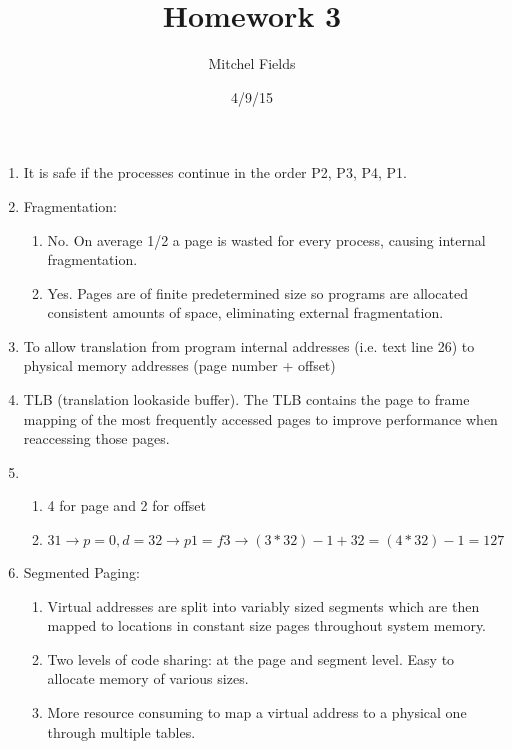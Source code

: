 \documentclass{article}
\begin{document}
\title{Homework 3}
\author{Mitchel Fields}
\date{4/9/15}
\maketitle

\begin{enumerate}

\item It is safe if the processes continue in the order P2, P3, P4, P1.

\item Fragmentation:
\begin{enumerate}
\renewcommand{\theenumi}{\Alph{enumi}}
\item No. On average 1/2 a page is wasted for every process, causing internal fragmentation.

\item Yes. Pages are of finite predetermined size so programs are allocated consistent amounts of space, eliminating external fragmentation.
\end{enumerate}

\item To allow translation from program internal addresses (i.e. text line 26) to physical memory addresses (page number + offset)

\item TLB (translation lookaside buffer). The TLB contains the page to frame mapping of the most frequently accessed pages to improve performance when reaccessing those pages.

\item 
\begin{enumerate}
\renewcommand{\theenumi}{\Alph{enumi}}
\item 4 for page and 2 for offset

\item $31 \rightarrow p = 0, d = 32 \rightarrow p1 = f3 \rightarrow (3*32)-1+32 = (4*32)-1 = 127$

\end{enumerate}

\item Segmented Paging:
\begin{enumerate}
\renewcommand{\theenumi}{\Alph{enumi}}
\item Virtual addresses are split into variably sized segments which are then mapped to locations in constant size pages throughout system memory.
\item Two levels of code sharing: at the page and segment level. Easy to allocate memory of various sizes.
\item More resource consuming to map a virtual address to a physical one through multiple tables.
\end{enumerate}




\end{enumerate}
\end{document}
